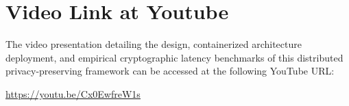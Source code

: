 \section*{Video Link at Youtube}

The video presentation detailing the design, containerized architecture deployment, and empirical cryptographic latency benchmarks of this distributed privacy-preserving framework can be accessed at the following YouTube URL:

\begin{center}
\underline{\url{https://youtu.be/Cx0EwfreW1s}}
\end{center}